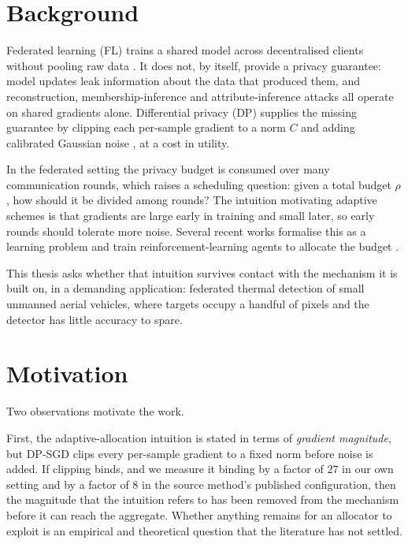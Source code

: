 \section{Background}

Federated learning (FL) trains a shared model across decentralised clients
without pooling raw data \cite{mcmahan2017communication}. It does not, by
itself, provide a privacy guarantee: model updates leak information about the
data that produced them, and reconstruction, membership-inference and
attribute-inference attacks all operate on shared gradients alone. Differential
privacy (DP) supplies the missing guarantee by clipping each per-sample gradient
to a norm $C$ and adding calibrated Gaussian noise \cite{abadi2016deep}, at a
cost in utility.

\vspace{10pt}

In the federated setting the privacy budget is consumed over many communication
rounds, which raises a scheduling question: given a total budget $\rho$, how
should it be divided among rounds? The intuition motivating adaptive schemes is
that gradients are large early in training and small later, so early rounds
should tolerate more noise. Several recent works formalise this as a learning
problem and train reinforcement-learning agents to allocate the budget
\cite{ChenAdaptivePrivacyMARL, WangDNORL}.

\vspace{10pt}

This thesis asks whether that intuition survives contact with the mechanism it
is built on, in a demanding application: federated thermal detection of small
unmanned aerial vehicles, where targets occupy a handful of pixels and the
detector has little accuracy to spare.

\section{Motivation}

Two observations motivate the work.

\vspace{10pt}

First, the adaptive-allocation intuition is stated in terms of \emph{gradient
magnitude}, but DP-SGD clips every per-sample gradient to a fixed norm before
noise is added. If clipping binds, and we measure it binding by a factor of
$27$ in our own setting and by a factor of $8$ in the source method's published
configuration, then the magnitude that the intuition refers to has been removed
from the mechanism before it can reach the aggregate. Whether anything remains
for an allocator to exploit is an empirical and theoretical question that the
literature has not settled.

